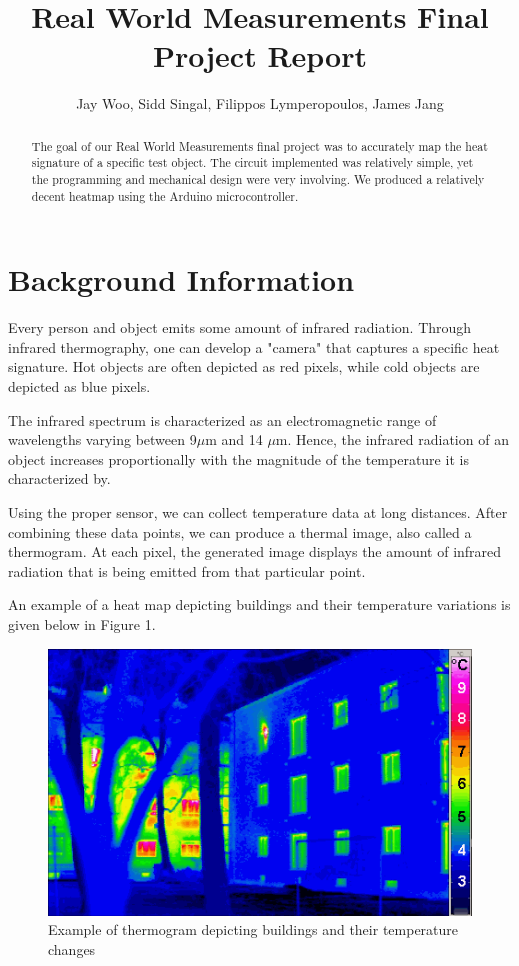 \documentclass[11pt]{article}
\title{Real World Measurements Final Project Report}
\author{Jay Woo, Sidd Singal, Filippos Lymperopoulos, James Jang}
\begin{document}
\maketitle
\vspace*{45 mm}
\begin{abstract}
The goal of our Real World Measurements final project was to accurately map the heat signature of a specific test object. The circuit implemented was relatively simple, yet the programming and mechanical design were very involving. We produced a relatively decent heatmap using the Arduino microcontroller. 
\end{abstract}
\newpage

\section{Background Information}

Every person and object emits some amount of infrared radiation. Through infrared thermography, one can develop a "camera" that captures a specific heat signature. Hot objects are often depicted as red pixels, while cold objects are depicted as blue pixels.

The infrared spectrum is characterized as an electromagnetic range of wavelengths varying between 9$\mu$m and 14 $\mu$m. Hence, the infrared radiation of an object increases proportionally with the magnitude of the temperature it is characterized by.

Using the proper sensor, we can collect temperature data at long distances. After combining these data points, we can produce a thermal image, also called a thermogram. At each pixel, the generated image displays the amount of infrared radiation that is being emitted from that particular point.

An example of a heat map depicting buildings and their temperature variations is given below in Figure 1.

\begin{figure}[!ht]
	\centering
	\includegraphics[width=.8\textwidth]{example}
	\caption{Example of thermogram depicting buildings and their temperature changes}
	\label{fig:cover}
\end{figure}
\end{document}
